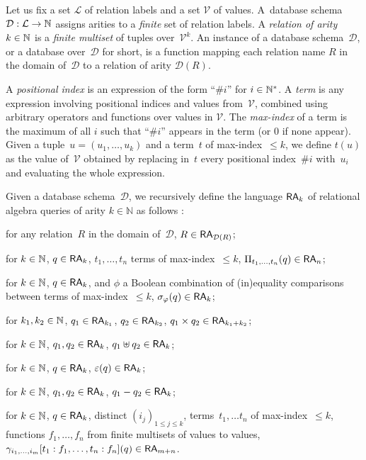 Let us fix a set $\mathcal{L}$ of relation labels and a set $\mathcal{V}$
of values. A~database schema
$\mathcal{D}:\mathcal{L}\to\mathbb{N}$ assigns arities to a \emph{finite}
set of relation labels.
A \emph{relation of arity~$k\in\mathbb{N}$} is a \emph{finite multiset} of
tuples over~$\mathcal{V}^k$. An instance of a database
schema~$\mathcal{D}$, or a database over~$\mathcal{D}$ for short, is a
function mapping each relation name $R$ in the domain of~$\mathcal{D}$ to
a relation of arity $\mathcal{D}(R)$.

A \emph{positional index} is an expression of the form ``$\#i$''
for $i\in\mathbb{N}^*$. A \emph{term} is any expression involving
positional indices and values from~$\mathcal{V}$, combined using
arbitrary operators and functions over values in $\mathcal{V}$. The
\emph{max-index} of a term is the maximum of all $i$ such that
``\#$i$'' appears in the term (or 0 if none appear). Given a
tuple~$u=(u_1,\dots,u_k)$ and a term~$t$ of max-index~$\leq k$, we
define $t(u)$ as the value of~$\mathcal{V}$ obtained by replacing in~$t$
every
positional index~\#$i$ with~$u_i$ and evaluating the whole
expression.

Given a database schema~$\mathcal{D}$, we recursively define the language
$\mathsf{RA}_k$ of relational algebra queries of arity $k\in\mathbb{N}$ as
follows :
\begin{compactdesc}
	\item[relation] for any relation~$R$ in the domain of~$\mathcal{D}$,
	$R\in\mathsf{RA}_{\mathcal{D}(R)}$;
	\item[projection] for $k\in\mathbb{N}$, $q\in\mathsf{RA}_{k}$,
	$t_1,\dots, t_n$ terms of max-index~\mbox{$\leq k$}, $\Pi_{t_1,\dots,t_n}(q)\in\mathsf{RA}_n$;
	\item[selection] for $k\in\mathbb{N}$, $q\in\mathsf{RA}_k$, and $\phi$ a
	Boolean combination of (in)equality comparisons between terms
	of max-index~$\leq k$,
	$\sigma_\varphi(q)\in\mathsf{RA}_k$;
	\item[cross product] for $k_1,k_2\in\mathbb{N}$, $q_1\in\mathsf{RA}_{k_1}$,
	$q_2\in\mathsf{RA}_{k_2}$, $q_1\times q_2\in\mathsf{RA}_{k_1+k_2}$;
	\item[multiset sum] for $k\in\mathbb{N}$, $q_1,q_2\in\mathsf{RA}_k$,
	$q_1\uplus q_2\in\mathsf{RA}_k$;
	\item[duplicate elimination] for $k\in\mathbb{N}$,
	$q\in\mathsf{RA}_k$, $\varepsilon(q)\in\mathsf{RA}_k$;
	\item[multiset difference] for $k\in\mathbb{N}$, $q_1,q_2\in\mathsf{RA}_k$, $q_1 - q_2\in\mathsf{RA}_k$;
	\item[aggregation] for $k\in\mathbb{N}$,
	$q\in\mathsf{RA}_k$, distinct $(i_j)_{1\leq j\leq k}$,
	terms~$t_1,\dots t_n$
	of max-index~$\leq k$, functions $f_1,\dots,f_n$ from finite multisets of values to
	values,
	$\gamma_{i_1,\dots,i_m}[t_1:f_1,\dots,t_n:f_n](q)\in\mathsf{RA}_{m+n}$.
\end{compactdesc}

